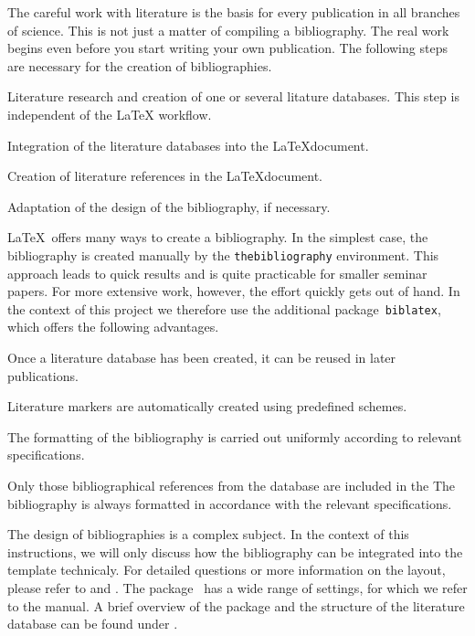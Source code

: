 The careful work with literature is the basis for every publication in all
branches of science. This is not just a matter of compiling a bibliography. The
real work begins even before you start writing your own publication. The
following steps are necessary for the creation of bibliographies.
%
\begin{compactenum}
\item Literature research and creation of one or several litature databases.
      This step is independent of the LaTeX workflow.
\item Integration of the literature databases into the \LaTeX document.
\item Creation of literature references in the \LaTeX document.
\item Adaptation of the design of the bibliography, if necessary.
\end{compactenum}

\LaTeX\ offers many ways to create a bibliography. In the simplest
case, the bibliography is created manually by the \texttt{thebibliography} environment.
This approach leads to quick results and is quite practicable for smaller
seminar papers. For more extensive work, however, the effort quickly gets out
of hand. In the context of this project we therefore use the additional
package~\texttt{biblatex}, which offers the following advantages.
%
\begin{compactitem}
\item Once a literature database has been created, it can be reused in later
      publications.
\item Literature markers are automatically created using predefined schemes.
\item The formatting of the bibliography is carried out uniformly according to
      relevant specifications.
\item Only those bibliographical references from the database are included in the
      The bibliography is always formatted in accordance with the relevant specifications.
\end{compactitem}

The design of bibliographies is a complex subject. In the context of this
instructions, we will only discuss how the bibliography can be integrated into
the template technicaly. For detailed questions or more information on the
layout, please refer to \cite{voss_bibliografien} and \cite[chapter~13]{voss_wissenschaftliche_arbeit}.
The package~ has a wide range of settings, for which we refer
to the manual. A brief overview of the package and the structure of the
literature database can be found under \cite{rees_biblatex_cheat}.
